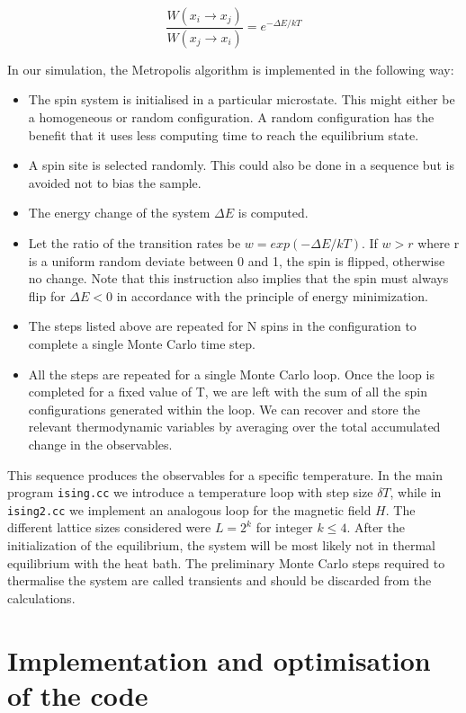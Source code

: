 \documentclass[a4paper]{article}
\begin{document}
\begin{equation}
\frac{W(x_i \rightarrow x_j)}{W(x_j \rightarrow x_i)} =  e^{-\Delta E/kT}
\end{equation}

 
In our simulation, the Metropolis algorithm is implemented in the following way:
\begin{itemize}
\item The spin system is initialised in a particular microstate. This might either be a homogeneous or random configuration. A random configuration has the benefit that it uses less computing time to reach the equilibrium state.
\item A spin site is selected randomly. This could also be done in a sequence but is avoided  not to bias the sample.
\item The energy change of the system $\Delta E$ is computed.
\item Let the ratio of the transition rates be $w = exp(-\Delta E/kT)$. If $w > r$ where r is a uniform random deviate between 0 and 1, the spin is flipped, otherwise no change. Note that this instruction also implies that the spin must always flip for $\Delta E < 0 $ in accordance with the principle of energy minimization. 
\item The steps listed above are repeated for N spins in the configuration to complete a single Monte Carlo time step.
\item All the steps are repeated for a single Monte Carlo loop. Once the loop is completed for a fixed value of T, we are left with the sum of all the spin configurations generated within the loop. We can recover and store the relevant thermodynamic variables by averaging over the total accumulated change in the observables.
\end{itemize}


This sequence produces the observables for a specific temperature. In the main program \verb;ising.cc; we introduce a temperature loop with step size $\delta T$, while in \verb;ising2.cc; we implement an analogous loop for the magnetic field $H$. The different lattice sizes considered were $L = 2^k$ for integer $k \leq 4 $. After the initialization of the equilibrium, the system will be most likely not in thermal equilibrium with the heat bath. The preliminary Monte Carlo steps required to thermalise the system are called transients and should be discarded from the calculations. 

\section{Implementation and optimisation of the code}
\end{document}
